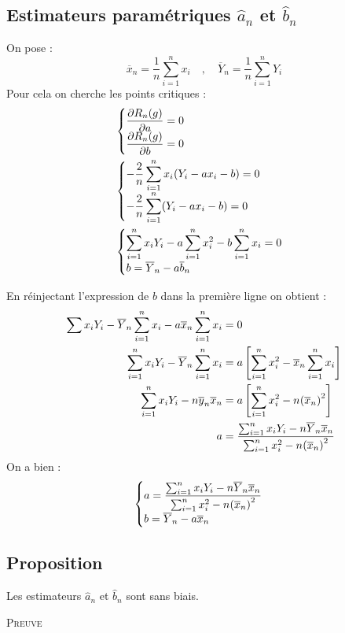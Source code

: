 \documentclass[12pt]{article}
\newcommand{\dps}{\displaystyle}
\newcommand{\parr}[1]{\hspace{-0.05cm}\left(#1 \right)}
\newcommand{\rect}[1]{\left[ #1 \right]}
\begin{document}
	
	\subsection{Estimateurs paramétriques $\hat{a}_n$ et $\hat{b}_n$}
	On pose : 
	\begin{equation*}
		\overline{x}_{n} = \frac{1}{n}\sum_{i=1}^{n}x_i\quad , \quad  \overline{Y}_{n} = \frac{1}{n}\sum_{i=1}^{n}Y_i
	\end{equation*}
	Pour cela on cherche les points critiques : 
	\begin{align*}
		&\begin{cases}
			\dps 
			\frac{\partial R_{n}(g)}{\partial a} = 0
			\\
			\dps \frac{\partial R_{n}(g)}{\partial b} = 0
		\end{cases}
		\\
		&\begin{cases}
			\dps 
			-\frac{2}{n}\sum_{i=1}^{n}x_i \parr{Y_i - ax_i - b } = 0
			\\
			\dps -\frac{2}{n}\sum_{i=1}^{n}(Y_i - ax_i - b) = 0
		\end{cases}
		\\
		&\begin{cases}
			\dps 
			\sum_{i=1}^{n} x_i Y_i - a\sum_{i=1}^{n}x_i^{2} - b\sum_{i=1}^{n}x_i = 0
			\\
			\dps b = \overline{Y}_{n} - a\overline{b}_n
		\end{cases}
	\end{align*}
	
	En réinjectant l'expression de $b$ dans la première ligne on obtient :
	\begin{align*}
		\sum_{}^{}x_iY_i - \overline{Y}_n\sum_{i=1}^{n}x_i - a\overline{x}_n\sum_{i=1}^{n}x_i &= 0
		\\
		\sum_{i=1}^{n}x_i Y_i - \overline{Y}_{n} \sum_{i=1}^{n}x_i &= a \rect{ \sum_{i=1}^{n}x_i^{2} - \overline{x}_n \sum_{i=1}^{n}x_i }
		\\
		\sum_{i=1}^{n}x_i Y_i -n\overline{y}_n \overline{x}_n&= a \rect{\sum_{i=1}^{n}x_i^2 -n\parr{\overline{x}_n}^2} 
		\\
		a&=\dfrac{\sum_{i=1}^{n}x_i Y_i -n\overline{Y}_n \overline{x}_n}{\sum_{i=1}^{n}x_i^2 -n\parr{\overline{x}_n}^2}
	\end{align*}
On a bien :
\begin{equation*}
	\begin{cases}
		a=\dfrac{\sum_{i=1}^{n}x_iY_i -n\overline{Y}_n \overline{x}_n}{\sum_{i=1}^{n}x_i^2 -n\parr{\overline{x}_n}^2}
		\\
		b=\overline{Y}_n - a\overline{x}_{n}
	\end{cases}
\end{equation*}

\subsection*{Proposition}
Les estimateurs $\hat{a}_{n}$ et $\hat{b}_{n}$ sont sans biais.

\textsc{Preuve}
\end{document}
